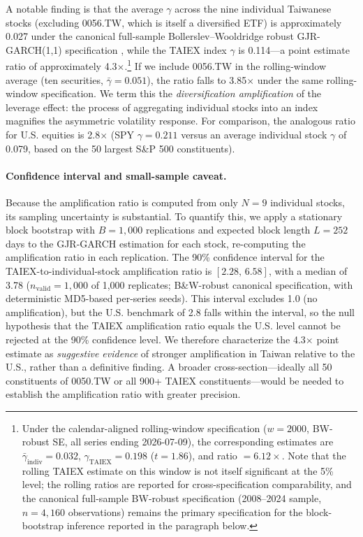 A notable finding is that the average $\gamma$ across the nine individual Taiwanese stocks (excluding 0056.TW, which is itself a diversified ETF) is approximately 0.027 under the canonical full-sample Bollerslev--Wooldridge robust GJR-GARCH(1,1) specification \citep{bollerslev1992}, while the TAIEX index $\gamma$ is 0.114---a point estimate ratio of approximately 4.3$\times$.\footnote{Under the calendar-aligned rolling-window specification ($w=2000$, BW-robust SE, all series ending 2026-07-09), the corresponding estimates are $\bar{\gamma}_{\text{indiv}}=0.032$, $\gamma_{\text{TAIEX}}=0.198$ ($t=1.86$), and ratio $=6.12\times$. Note that the rolling TAIEX estimate on this window is not itself significant at the 5\% level; the rolling ratios are reported for cross-specification comparability, and the canonical full-sample BW-robust specification (2008--2024 sample, $n=4{,}160$ observations) remains the primary specification for the block-bootstrap inference reported in the paragraph below.} If we include 0056.TW in the rolling-window average (ten securities, $\bar{\gamma} = 0.051$), the ratio falls to 3.85$\times$ under the same rolling-window specification. We term this the \textit{diversification amplification} of the leverage effect: the process of aggregating individual stocks into an index magnifies the asymmetric volatility response. For comparison, the analogous ratio for U.S. equities is 2.8$\times$ (SPY $\gamma = 0.211$ versus an average individual stock $\gamma$ of 0.079, based on the 50 largest S\&P 500 constituents).

\paragraph{Confidence interval and small-sample caveat.} Because the amplification ratio is computed from only $N = 9$ individual stocks, its sampling uncertainty is substantial. To quantify this, we apply a stationary block bootstrap \citep[Politis-Romano][]{politis1994} with $B=1{,}000$ replications and expected block length $L=252$ days to the GJR-GARCH estimation for each stock, re-computing the amplification ratio in each replication. The 90\% confidence interval for the TAIEX-to-individual-stock amplification ratio is $[2.28, \, 6.58]$, with a median of 3.78 ($n_{\text{valid}}=1{,}000$ of 1,000 replicates; B\&W-robust canonical specification, with deterministic MD5-based per-series seeds). This interval excludes 1.0 (no amplification), but the U.S. benchmark of 2.8 falls within the interval, so the null hypothesis that the TAIEX amplification ratio equals the U.S. level cannot be rejected at the 90\% confidence level. We therefore characterize the 4.3$\times$ point estimate as \textit{suggestive evidence} of stronger amplification in Taiwan relative to the U.S., rather than a definitive finding. A broader cross-section---ideally all 50 constituents of 0050.TW or all 900+ TAIEX constituents---would be needed to establish the amplification ratio with greater precision.


